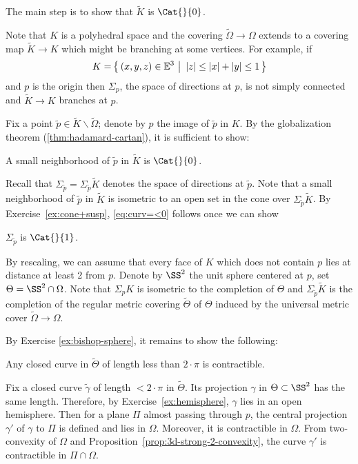 The main step is to show that $\tilde K$ is $\Cat{}{0}$. 

Note that $K$ is a polyhedral space and the covering $\tilde\Omega\to\Omega$ extends to a covering map $\tilde K\to K$ which might be branching at some vertices.
For example, if \[K=\set{(x,y,z)\in\EE^3}{|z|\le |x|+|y|\le 1}\] and $p$ is the origin then $\Sigma_p$,
the space of directions at $p$,
is not simply connected and $\tilde K\to K$ branches at $p$.


Fix a point $\tilde p\in \tilde K\backslash\tilde\Omega$; 
denote by $p$ the image of $\tilde p$ in $K$.
By the globalization theorem (\ref{thm:hadamard-cartan}), it is sufficient to show:

\begin{clm}{}\label{eq:curv=<0}
A small neighborhood of $\tilde p$ in $\tilde K$ is $\Cat{}{0}$.
\end{clm}

Recall that $\Sigma_{\tilde p}=\Sigma_{\tilde p}\tilde K$ denotes the space of directions at $\tilde p$.
Note that a small neighborhood of $\tilde p$ in $\tilde K$
is isometric to an open set in the cone over $\Sigma_{\tilde p}\tilde K$.
By Exercise~\ref{ex:cone+susp}, \ref{eq:curv=<0} follows once we can show 

\begin{clm}{}\label{eq:curv=<1}
$\Sigma_{\tilde p}$ is $\Cat{}{1}$.
\end{clm}

By  rescaling, we can assume that every face of $K$ which does not contain $p$ lies at distance at least 2 from $p$.
Denote by $\SS^2$ the unit sphere centered at $p$,
set $\Theta=\SS^2\cap\Omega$.
Note that $\Sigma_pK$ is isometric to the completion of $\Theta$
and $\Sigma_{\tilde p}\tilde K$ is the completion of the regular metric covering $\tilde\Theta$ of $\Theta$  induced by the universal metric cover $\tilde \Omega\to \Omega$.

By Exercise \ref{ex:bishop-sphere}, it remains to show  the following:
\begin{clm}{}
Any closed curve in $\tilde\Theta$ of length less than $2\cdot\pi$ is contractible.
\end{clm}

Fix a closed curve $\tilde \gamma$ of length $<2\cdot\pi$ in $\tilde\Theta$.
Its projection $\gamma$ in $\Theta\subset\SS^2$ has the same length.
Therefore, by Exercise~\ref{ex:hemisphere}, $\gamma$ lies in an open hemisphere.
Then for a plane $\Pi$ almost passing through $p$,
the central projection $\gamma'$ of $\gamma$ to $\Pi$ is defined and lies in $\Omega$. 
Moreover, it is contractible in $\Omega$.
From two-convexity of $\Omega$
and Proposition~\ref{prop:3d-strong-2-convexity},
the curve $\gamma'$ is contractible in $\Pi\cap \Omega$.


